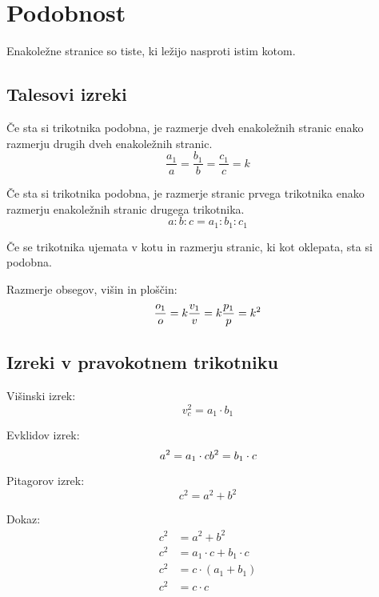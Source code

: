 \documentclass[a4paper,oneside,12pt,fleqn]{article}
\newcommand\krat\cdot
\numberwithin{equation}{section}
\begin{document}
\section{Podobnost}
\label{sec:podob}
Enakoležne stranice so tiste, ki ležijo nasproti istim kotom.

\subsection{Talesovi izreki}
Če sta si trikotnika podobna, je razmerje dveh enakoležnih stranic enako razmerju drugih
dveh enakoležnih stranic.
\begin{equation}
  \frac{a_1}{a} = \frac{b_1}{b} = \frac{c_1}{c} = k 
  \label{eq:podob:tal1}
\end{equation}

Če sta si trikotnika podobna, je razmerje stranic prvega trikotnika enako razmerju
enakoležnih stranic drugega trikotnika.
\begin{equation}
  a : b : c = a_1 : b_1 : c_1
  \label{eq:podob:tal2}
\end{equation}

Če se trikotnika ujemata v kotu in razmerju stranic, ki kot oklepata, sta si podobna.

Razmerje obsegov, višin in ploščin:
\[ \frac{o_1}{o} = k  \\
 \frac{v_1}{v} = k  \\
 \frac{p_1}{p} = k^2 \]

\subsection{Izreki v pravokotnem trikotniku}
Višinski izrek:
\begin{equation}
  v_c^2 = a_1 \krat b_1
  \label{eq:podob:trik:vis}
\end{equation}

Evklidov izrek:
\begin{equation}
  a^2 = a_1 \krat c \\
  b^2 = b_1 \krat c
  \label{eq:podob:trik:evk}
\end{equation}

Pitagorov izrek:
\begin{equation}
  c^2 = a^2 + b^2
  \label{eq:podob:trik:pit}
\end{equation}

Dokaz:
\begin{align*}
  c^2 &= a^2 + b^2 \\
  c^2 &= a_1 \krat c + b_1 \krat c \\
  c^2 &= c \krat (a_1 + b_1) \\
  c^2 &= c \krat c \\
\end{align*}
\end{document}

